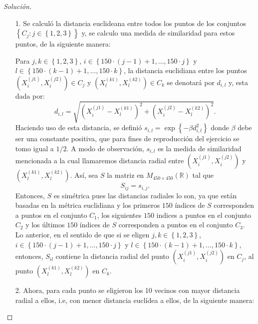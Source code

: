 \documentclass[10.5pt,notitlepage]{article}
\newenvironment{solucion}
  {\begin{proof}[Solución]}
  {\end{proof}}
\newcommand{\RR}{\mathbb{R}}
\newcommand{\kis}[1]{\left\{ #1 \right\}}
\newcommand{\pare}[1]{\left( #1 \right)}
\theoremstyle{plain}
\begin{document}
\begin{solucion}
\begin{itemize}
    \item[1.] Se calculó la distancia euclideana entre todos los puntos de los conjuntos \(\kis{C_{j} : j\in\kis{1,2,3}}\) y, se calculo una medida de similaridad para estos puntos, de la siguiente manera:
    
    Para \(j,k \in \kis{1,2,3}\), \(i \in \kis{150\cdot(j-1) + 1, \hdots, 150\cdot j}\) y \(l \in \kis{150\cdot(k-1) + 1, \hdots, 150\cdot k}\), la distancia euclidiana entre los puntos \((X^{(j1)}_{i},X^{(j2)}_{i}) \in C_{j}\) y \((X^{(k1)}_{l},X^{(k2)}_{l}) \in C_{k}\) se denotará por \(d_{i,l}\) y, esta dada por: 
    \[
    d_{i,l} = \sqrt{\pare{X^{(j1)}_{i} - X^{(k1)}_{l}}^2 + \pare{X^{(j2)}_{i} - X^{(k2)}_{l}}^2}.
    \]
    Haciendo uso de esta distancia, se definió \(s_{i,l} = \exp\kis{-\beta d_{i,l}^2}\) donde \(\beta\) debe ser una constante positiva, que para fines de reproducción del ejercicio se tomo igual a \(1/2\). A modo de observación, \(s_{i,l}\) es la medida de similaridad mencionada a la cual llamaremos distancia radial entre \((X^{(j1)}_{i},X^{(j2)}_{i})\) y \((X^{(k1)}_{l},X^{(k2)}_{l})\). 
    Así, sea \(S\) la matriz en \(M_{450\times 450}(\RR)\) tal que 
    \[
    S_{ij} = s_{i,j}.
    \]
    Entonces, \(S\) es simétrica pues las distancias radiales lo son, ya que están basadas en la métrica euclidiana y los primeros \(150\) índices de \(S\) corresponden a puntos en el conjunto \(C_1\), los siguientes \(150\) indices a puntos en el conjunto \(C_2\) y los últimos \(150\) índices de \(S\) corresponden a puntos en el conjunto \(C_3\). Lo anterior, en el sentido de que si se eligen \(j,k \in \kis{1,2,3}\), \(i \in \kis{150\cdot(j-1) + 1, \hdots, 150\cdot j}\) y \(l \in \kis{150\cdot(k-1) + 1, \hdots, 150\cdot k}\), entonces, \(S_{il}\) contiene la distancia radial del punto \((X^{(j1)}_{i},X^{(j2)}_{i})\) en \(C_{j}\), al punto \((X^{(k1)}_{l},X^{(k2)}_{l})\) en \(C_{k}\).
    \item[2.] Ahora, para cada punto se eligieron los 10 vecinos con mayor distancia radial a ellos, i.e, con menor distancia euclídea a ellos, de la siguiente manera: 
    

\end{itemize}
\end{solucion}
\end{document}
